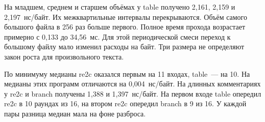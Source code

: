 На младшем, среднем и старшем объёмах у table получено 2,161, 2,159 и 2,197~нс/байт. Их межквартильные интервалы перекрываются. Объём самого большого файла в 256 раз больше первого. Полное время прохода возрастает примерно с 0,133 до 34,56~мс. Для этой периодической смеси переход к большому файлу мало изменил расходы на байт. Три размера не определяют закон роста для произвольного текста.

По минимуму медианы re2c оказался первым на 11 входах, table~--- на 10. На  медианы этих программ отличаются на 0,004~нс/байт. На длинных комментариях у re2c и branch получены 1,388 и 1,397~нс/байт. На первом входе table опередил re2c в 10 раундах из 16, на втором re2c опередил branch в 9 из 16. У каждой пары разница медиан мала на фоне разброса.
